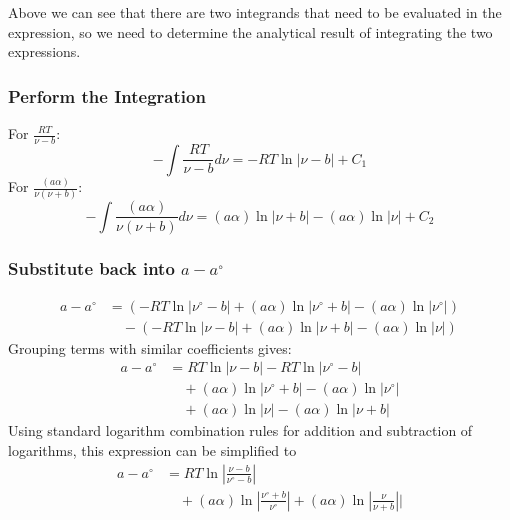 \documentclass{article}
\begin{document}
Above we can see that there are two integrands that need to be evaluated in the expression, so we need to determine the analytical result of integrating the two expressions.

\subsubsection{Perform the Integration}

For \( \frac{RT}{\nu-b} \):
\begin{equation}
-\int \frac{RT}{\nu-b} d\nu = -RT \ln|\nu-b| + C_1
\end{equation}
For \( \frac{(a\alpha)}{\nu(\nu+b)} \):
\begin{equation}
-\int \frac{(a\alpha)}{\nu(\nu+b)} d\nu = (a\alpha) \ln|\nu+b| - (a\alpha) \ln|\nu| + C_2
\end{equation}


\subsubsection{Substitute back into \( a - a^\circ \)}

\begin{align}
a - a^\circ &= \left(-RT \ln|\nu^\circ - b| + (a\alpha) \ln|\nu^\circ + b| - (a\alpha) \ln|\nu^\circ|\right) \nonumber \\
&\quad - \left(-RT \ln|\nu - b| + (a\alpha) \ln|\nu + b| - (a\alpha) \ln|\nu|\right)
\end{align}
Grouping terms with similar coefficients gives:
\begin{equation}
\begin{split}
a - a^\circ &= RT \ln|\nu - b| -RT \ln|\nu^\circ - b| \\
&\quad + (a\alpha) \ln|\nu^\circ + b| - (a\alpha) \ln|\nu^\circ| \\
&\quad + (a\alpha) \ln|\nu| - (a\alpha) \ln|\nu + b|
\end{split}
\end{equation}
Using standard logarithm combination rules for addition and subtraction of logarithms, this expression can be simplified to
\begin{equation}
\begin{split}
a - a^\circ &= RT \ln|\frac{\nu - b}{\nu^\circ - b}| \\
&\quad + (a\alpha) \ln|\frac{\nu^\circ + b}{\nu^\circ}| + (a\alpha) \ln|\frac{\nu}{\nu + b}||
\end{split}
\end{equation}
\end{document}
